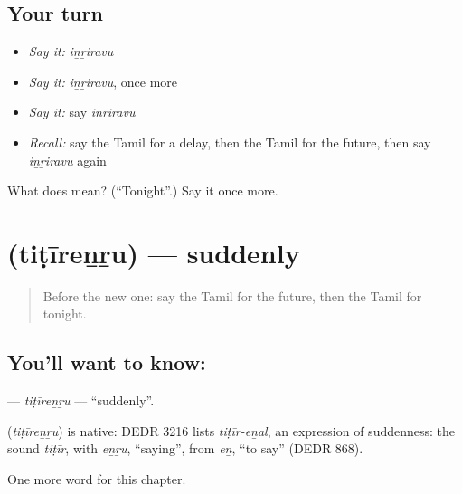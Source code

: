 \subsection*{Your turn}
\begin{itemize}
\raggedright
  \item \emph{Say it:} \emph{iṉṟiravu}
  \item \emph{Say it:} \emph{iṉṟiravu}, once more
  \item \emph{Say it:} say \emph{iṉṟiravu}
  \item \emph{Recall:} say the Tamil for a delay, then the Tamil for the future, then say \emph{iṉṟiravu} again
\end{itemize}

\begin{tcolorbox}[breakable,colback=teal!4,colframe=teal!35!black,title={Before you move on}]
What does  mean? (\textquotedblleft{}Tonight\textquotedblright{}.) Say it once more.
\end{tcolorbox}
\section[\texorpdfstring{\ta{திடீரென்று} (tiṭīreṉṟu)}{திடீரென்று (tiṭīreṉṟu)}]{ (tiṭīreṉṟu) — suddenly}

\label{lesson:TA-C172-titirenru}



\begin{quote}
Before the new one: say the Tamil for the future, then the Tamil for tonight.
\end{quote}

\subsection*{You'll want to know: }
\textbf{} — \emph{tiṭīreṉṟu} — \textquotedblleft{}suddenly\textquotedblright{}.

\begin{cousinweb}
\textbf{} (\emph{tiṭīreṉṟu}) is native: DEDR 3216 lists \emph{tiṭīr-eṉal}, an expression of suddenness: the sound \emph{tiṭīr}, with \emph{eṉṟu}, \textquotedblleft{}saying\textquotedblright{}, from \emph{eṉ}, \textquotedblleft{}to say\textquotedblright{} (DEDR 868).
\end{cousinweb}

\begin{grammarlens}[title={What you've built}]
One more word for this chapter.
\end{grammarlens}

